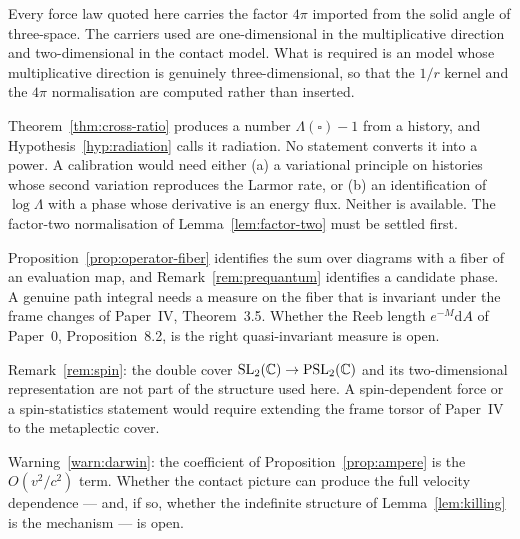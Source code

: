 \begin{problem}
Every force law quoted here carries the factor $4\pi$ imported from the solid
angle of three-space.  The \AEG{} carriers used are one-dimensional in the
multiplicative direction and two-dimensional in the contact model.  What is
required is an \AEG{} model whose multiplicative direction is genuinely
three-dimensional, so that the $1/r$ kernel and the $4\pi$ normalisation are
computed rather than inserted.
\end{problem}

\begin{problem}
Theorem~\ref{thm:cross-ratio} produces a number $\Lambda(\square)-1$ from a
history, and Hypothesis~\ref{hyp:radiation} calls it radiation.  No statement
converts it into a power.  A calibration would need either (a) a variational
principle on histories whose second variation reproduces the Larmor rate, or
(b) an identification of $\log\Lambda$ with a phase whose derivative is an energy
flux.  Neither is available.  The factor-two normalisation of
Lemma~\ref{lem:factor-two} must be settled first.
\end{problem}

\begin{problem}
Proposition~\ref{prop:operator-fiber} identifies the sum over diagrams with a
fiber of an evaluation map, and Remark~\ref{rem:prequantum} identifies a
candidate phase.  A genuine path integral needs a measure on the fiber that is
invariant under the frame changes of Paper~IV, Theorem~3.5.  Whether the Reeb
length $e^{-M}\mathrm dA$ of Paper~0, Proposition~8.2, is the right
quasi-invariant measure is open.
\end{problem}

\begin{problem}[Spin]
Remark~\ref{rem:spin}: the double cover $\operatorname{SL}_2(\mathbb{C})\to\operatorname{PSL}_2(\mathbb{C})$ and its
two-dimensional representation are not part of the \AEG{} structure used here.
A spin-dependent force or a spin-statistics statement would require extending
the frame torsor of Paper~IV to the metaplectic cover.
\end{problem}

\begin{problem}
Warning~\ref{warn:darwin}: the coefficient of
Proposition~\ref{prop:ampere} is the $O(v^{2}/c^{2})$ term.  Whether the contact
picture can produce the full velocity dependence --- and, if so, whether the
indefinite structure of Lemma~\ref{lem:killing} is the mechanism --- is open.
\end{problem}

